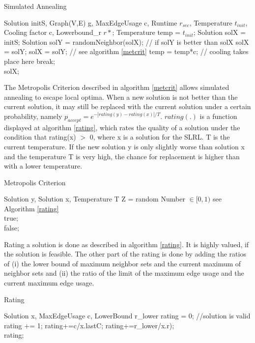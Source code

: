 \documentclass [12pt]{article}
\begin{document}
\begin {algorithm} [H]
\caption {Simulated Annealing}
\label {simA}
\begin {algorithmic} [3]
\Require Solution initS, Graph(V,E) g, MaxEdgeUsage c, Runtime $r_{sec}$, Temperature $t_{init}$, Cooling factor c,
Lowerbound\_r $r*$; 
\State Temperature temp = $t_{init}$;
\State Solution solX = initS; 
\State Solution solY = randomNeighbor(solX);
 // if solY is better than solX
\State solX = solY;
\Else
{}
\State solX = solY; // see algorithm \ref{metcrit}
\EndIf
\EndIf    
\State temp = temp*c; // cooling takes place here
\State break;
\EndIf 
\EndWhile\\
\Return solX;
\end {algorithmic}
\end {algorithm}

The Metropolis Criterion described in algorithm \ref{metcrit} allows simulated annealing to escape local optima. When a new solution is not better 
than the current solution, it may still be replaced with the current solution under a certain probability,
namely $p_{accept}=e^{-|rating(y)-rating(x)|/T}$. $rating(.)$ is a function displayed at algorithm \ref{rating}, which rates the quality of a solution under the condition
that rating(x) $>$ 0, where x is a solution for the SLRL. T is the current temperature. If the new solution y is only slightly worse than solution x and the temperature T is very high,
the chance for replacement is higher than with a lower temperature.

\begin {algorithm} [H]
\caption {Metropolis Criterion}
\label {metcrit}
\begin {algorithmic} [3]
\Require Solution y, Solution x, Temperature T
\State Z = random Number $\in [0,1)$
   \Comment see Algorithm \ref{rating}\\
  \Return true;
  \EndIf\\
  \Return false;
  \end {algorithmic}
  \end {algorithm}

  Rating a solution is done as described in algorithm \ref{rating}. It is highly valued, if the solution is
  feasible. The other part of the rating is done by adding the ratios of (i) the lower bound of maximum neighbor sets and the current maximum of neighbor sets and
  (ii) the ratio of the limit of the maximum edge usage and the current maximum edge usage.
  \begin {algorithm} [H]
  \caption {Rating}
  \label {rating}
  \begin {algorithmic} [3]
  \Require Solution x, MaxEdgeUsage c, LowerBound r\_lower
  \State rating = 0;
  \State //solution is valid
  rating += 1;
  \EndIf
  \State rating+=c/x.lastC;
  \State rating+=r\_lower/x.r);\\
  \Return rating;

  \end {algorithmic}
  \end {algorithm}
\end{document}
